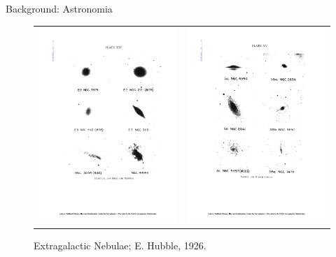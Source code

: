 \documentclass[10pt,xcolor=svgnames]{beamer}
\begin{document}
\begin{frame}{Background: Astronomia}
\begin{minipage}{0.54\textwidth}
\begin{figure}
\begin{tabular}{cc}
        \includegraphics[width=0.49\linewidth,trim={50mm 65mm 35mm 55mm},clip]{papers/hubble-5.pdf} & \includegraphics[width=0.49\linewidth,trim={50mm 65mm 35mm 55mm},clip]{papers/hubble-8.pdf}
      \end{tabular}
      \caption{Extragalactic Nebulae; E. Hubble, 1926.}
    \end{figure}
  \end{minipage}
\end{frame}
\end{document}
